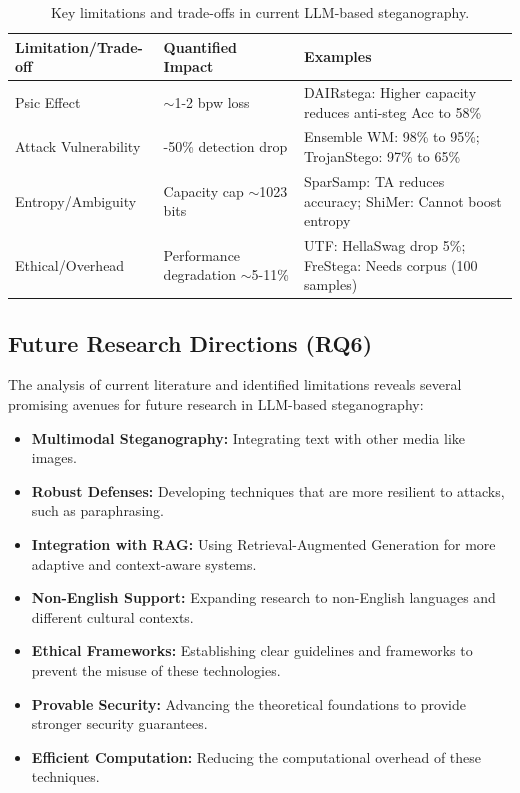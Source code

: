 \begin{table}[h]
	\centering
	\small
	\caption{Key limitations and trade-offs in current LLM-based steganography.}
	\label{tab:limitations}
	\begin{tabular}{|>{\raggedright\arraybackslash}p{2.8cm}|>{\raggedright\arraybackslash}p{2.8cm}|>{\raggedright\arraybackslash}p{6.4cm}|}
		\hline
		\textbf{Limitation/Trade-off} & \textbf{Quantified Impact}           & \textbf{Examples}                                             \\
		\hline
		Psic Effect                   & $\sim$1-2 bpw loss                   & DAIRstega: Higher capacity reduces anti-steg Acc to 58\%      \\
		\hline
		Attack Vulnerability          & 5-50\% detection drop                & Ensemble WM: 98\% to 95\%; TrojanStego: 97\% to 65\%          \\
		\hline
		Entropy/Ambiguity             & Capacity cap $\sim$1023 bits         & SparSamp: TA reduces accuracy; ShiMer: Cannot boost entropy   \\
		\hline
		Ethical/Overhead              & Performance degradation $\sim$5-11\% & UTF: HellaSwag drop 5\%; FreStega: Needs corpus (100 samples) \\
		\hline
	\end{tabular}
\end{table}

\subsection{Future Research Directions (RQ6)}
\label{subsec:rq6}

The analysis of current literature and identified limitations reveals several promising avenues for future research in LLM-based steganography:
\begin{itemize}
	\item \textbf{Multimodal Steganography:} Integrating text with other media like images.
	\item \textbf{Robust Defenses:} Developing techniques that are more resilient to attacks, such as paraphrasing.
	\item \textbf{Integration with RAG:} Using Retrieval-Augmented Generation for more adaptive and context-aware systems.
	\item \textbf{Non-English Support:} Expanding research to non-English languages and different cultural contexts.
	\item \textbf{Ethical Frameworks:} Establishing clear guidelines and frameworks to prevent the misuse of these technologies.
	\item \textbf{Provable Security:} Advancing the theoretical foundations to provide stronger security guarantees.
	\item \textbf{Efficient Computation:} Reducing the computational overhead of these techniques.
\end{itemize}

